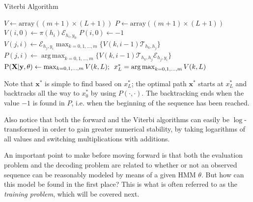 \documentclass{article}\usepackage[]{graphicx}\usepackage[]{color}
\DeclareMathOperator*{\argmax}{arg\,max}
\begin{document}
\begin{algorithm}
\caption{Viterbi Algorithm}\label{alg:Viterbi}
\begin{algorithmic}
    \STATE $V \gets \text{array}((m+1) \times (L+1))$
    \STATE $P \gets \text{array}((m+1) \times (L+1))$
        \STATE $V(i,0) \gets \pi(h_i) \mathcal{E}_{h_i,y_0}$
        \STATE $P(i,0) \gets -1$
    \ENDFOR
            \STATE $V(j,i) \gets \mathcal{E}_{h_j, y_i}\max_{k=0,1,\ldots,m}\{V(k, i-1)\mathcal{T}_{h_k,h_j}\}$
            \STATE $P(j,i) \gets \argmax_{k=0,1,\ldots,m}\{V(k, i-1)\mathcal{T}_{h_k,h_j}\mathcal{E}_{h_j, y_i}\}$
        \ENDFOR
    \ENDFOR
    \RETURN $\text{P}(\mathbf{X}|\mathbf{y},\theta) \gets \max_{k=0,1,\ldots,m}V(k,L); \hspace{0.5em}x_L^* = \argmax_{k=0,1,\ldots,m}V(k,L)$
\end{algorithmic} 
\end{algorithm} 
Note that $\mathbf{x}^*$ is simple to find based on $x_L^*$; the optimal path $\mathbf{x}^*$ starts at $x_L^*$ and backtracks all the way to $x_0^*$ by using $P(\cdot, \cdot)$. The backtracking ends when the value $-1$ is found in $P$, i.e. when the beginning of the sequence has been reached. 

Also notice that both the forward and the Viterbi algorithms can easily be $\log$-transformed in order to gain greater numerical stability, by taking logarithms of all values and switching multiplications with additions. 

An important point to make before moving forward is that both the evaluation problem and the decoding problem are related to whether or not an observed sequence can be reasonably modeled by means of a given HMM $\theta$. But how can this model be found in the first place? This is what is often referred to as the \textit{training problem}, which will be covered next. 
\end{document}
